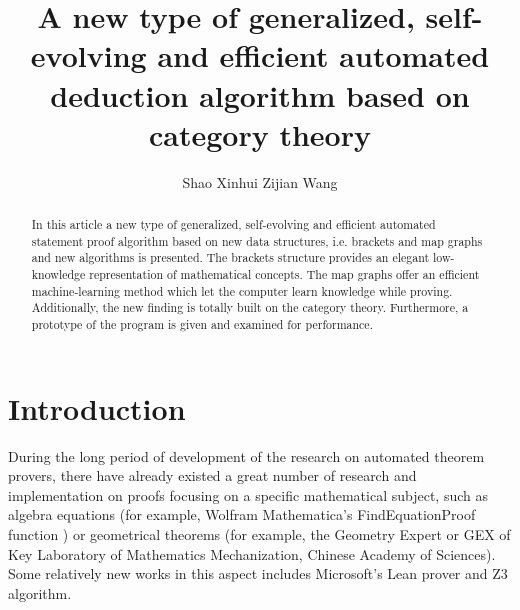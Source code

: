 \documentclass{aims}
\numberwithin{equation}{section}
\numberwithin{theorem}{section}	%
\numberwithin{axiom}{section}	%
\numberwithin{definition}{section}	%
\begin{document}
	\title{A new type of generalized, self-evolving and efficient automated deduction algorithm based on category theory}
	\author{%
		Shao Xinhui\corrauth
		Zijian Wang
	}
	\address{%
	}

	\begin{abstract}
	In this article a new type of generalized, self-evolving and efficient automated statement proof algorithm based on new data structures, i.e. brackets and map graphs
	and new algorithms is presented. The brackets structure provides an elegant low-knowledge representation of mathematical concepts. The map graphs offer an efficient machine-learning method which let the computer learn knowledge while proving. Additionally, the new finding is totally built on the category theory. Furthermore, a prototype of the program is given and examined for performance.
	\end{abstract}


	\maketitle
	
	\section{Introduction}
	During the long period of development of the research on automated theorem provers, there have already existed a great number of research and implementation on proofs focusing on a specific mathematical subject, such as algebra equations (for example, Wolfram Mathematica{'}s FindEquationProof function \cite{Wolfram2019}) or geometrical theorems (for example, the Geometry Expert or GEX \cite{Gao1998} of Key Laboratory of Mathematics Mechanization, Chinese Academy of Sciences). Some relatively new works in this aspect includes Microsoft{'}s Lean prover \cite{Moura2021} and Z3 \cite{Moura2008} algorithm.
	
\end{document}
